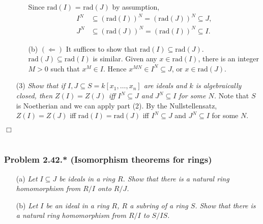 \documentclass{article}
\begin{document}
\begin{enumerate}
\begin{enumerate}
    Since $\mathrm{rad}(I)$ = $\mathrm{rad}(J)$ by assumption,
    \begin{align*}
      I^N &\subseteq (\mathrm{rad}(I))^N = (\mathrm{rad}(J))^N \subseteq J, \\
      J^N &\subseteq (\mathrm{rad}(J))^N = (\mathrm{rad}(I))^N \subseteq I.
    \end{align*}
    \item[(b)]
    $(\Longleftarrow)$
    It suffices to show that $\mathrm{rad}(I) \subseteq \mathrm{rad}(J)$.
    $\mathrm{rad}(J) \subseteq \mathrm{rad}(I)$ is similar.
    Given any $x \in \mathrm{rad}(I)$, there is an integer $M > 0$ such that
    $x^M \in I$.
    Hence $x^{MN} \in I^N \subseteq J$, or $x \in \mathrm{rad}(J)$.
  \end{enumerate}
  \item[(3)]
  \emph{Show that if $I, J \subseteq S = k[x_1,\ldots,x_n]$
  are ideals and $k$ is algebraically closed,
  then $Z(I) = Z(J)$ iff $I^N \subseteq J$ and $J^N \subseteq I$ for some $N$.}
  Note that $S$ is Noetherian and we can apply part (2).
  By the Nullstellensatz, $Z(I) = Z(J)$ iff $\mathrm{rad}(I) = \mathrm{rad}(J)$
  iff $I^N \subseteq J$ and $J^N \subseteq I$ for some $N$.
\end{enumerate}
$\Box$ \\\\






\subsubsection*{Problem 2.42.* (Isomorphism theorems for rings)}
\begin{enumerate}
\item[(a)]
  \emph{Let $I \subseteq J$ be ideals in a ring $R$.
  Show that there is a natural ring homomorphism from $R/I$ onto $R/J$.}

\item[(b)]
  \emph{Let $I$ be an ideal in a ring $R$, $R$ a subring of a ring $S$.
  Show that there is a natural ring homomorphism from $R/I$ to $S/IS$.} \\
\end{enumerate}
\end{document}
